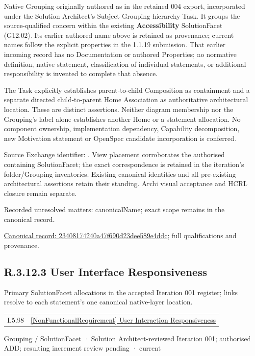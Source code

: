 Native Grouping originally authored as \texttt{} in the retained 004 export,
incorporated under the Solution Architect's Subject Grouping hierarchy Task.
It groups the source-qualified \texttt{} concern within
the existing \textbf{Accessibility} SolutionFacet (G12.02). Its earlier authored name above is retained as provenance; current names
follow the explicit properties in the 1.1.19 submission.
That earlier incoming record has no Documentation or authored Properties; no normative
definition, native statement, classification of individual statements, or
additional responsibility is invented to complete that absence.



The Task explicitly establishes parent-to-child Composition as containment and
a separate directed child-to-parent Home Association as authoritative architectural
location. These are distinct assertions. Neither diagram membership nor the
Grouping's label alone establishes another Home or a statement allocation.
No component ownership, implementation dependency, Capability decomposition,
new Motivation statement or OpenSpec candidate incorporation is conferred.



Source Exchange identifier: \texttt{}. View placement corroborates
the authorised containing SolutionFacet; the exact correspondence is retained in the
iteration's folder/Grouping inventories. Existing canonical identities and all
pre-existing architectural assertions retain their standing. Archi visual
acceptance and HCRL closure remain separate.


{\small Recorded unresolved matters: canonicalName; exact scope remains in the canonical record.}\par
{\footnotesize \href{../../../../../../../continuum/grouping/23408174240a47f690d23dee589e4ddc.md}{Canonical record: 23408174240a47f690d23dee589e4ddc}; full qualifications and provenance.}\par
\subsection*{R.3.12.3 User Interface Responsiveness}
\label{navigation:R.3.12.3}

Primary SolutionFacet allocations in the accepted Iteration 001 register; links resolve to each statement’s one canonical native-layer location.\par
\begin{longtable}{p{.22\linewidth}p{.73\linewidth}}
I.5.98 & \hyperref[element:0f07f89a3a854bfdac4d4fc423feefca]{[NonFunctionalRequirement] User Interaction Responsiveness} \\
\end{longtable}
\label{element:1f441cdb8fa342cca0afe5b3b65b368d}
{\small Grouping / SolutionFacet · Solution Architect-reviewed Iteration 001; authorised ADD; resulting increment review pending · current}\par

